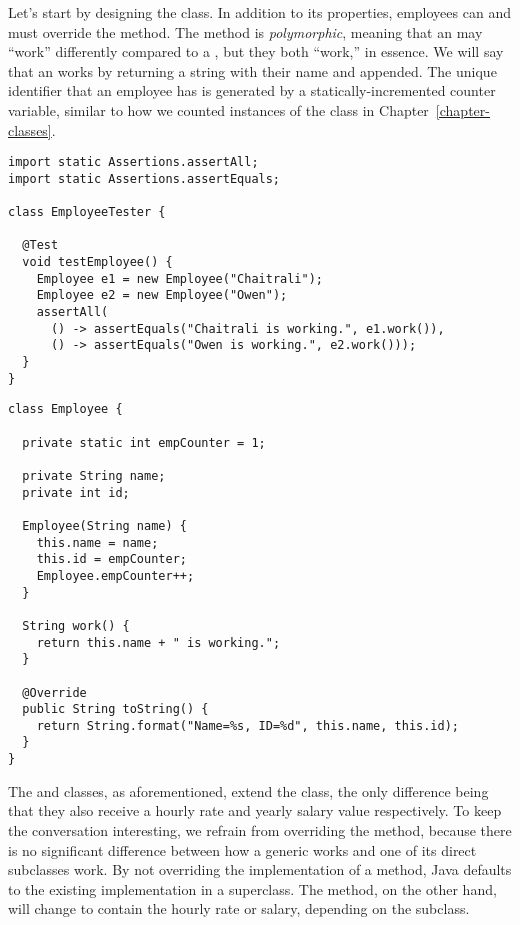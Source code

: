 Let's start by designing the  class. 
In addition to its properties, employees can  and must override the  method. 
The  method is \emph{polymorphic}, meaning that an  may ``work'' differently compared to a , but they both ``work,'' in essence. 
We will say that an  works by returning a string with their name and  appended. 
The unique identifier that an employee has is generated by a statically-incremented counter variable, similar to how we counted instances of the  class in Chapter~\ref{chapter-classes}.

\begin{lstlisting}[language=MyJava]
import static Assertions.assertAll;
import static Assertions.assertEquals;

class EmployeeTester {

  @Test
  void testEmployee() {
    Employee e1 = new Employee("Chaitrali");
    Employee e2 = new Employee("Owen");
    assertAll(
      () -> assertEquals("Chaitrali is working.", e1.work()),
      () -> assertEquals("Owen is working.", e2.work()));
  }
}
\end{lstlisting}

\begin{lstlisting}[language=MyJava]
class Employee {

  private static int empCounter = 1;

  private String name;
  private int id;

  Employee(String name) {
    this.name = name;
    this.id = empCounter;
    Employee.empCounter++;
  }

  String work() {
    return this.name + " is working.";
  }

  @Override
  public String toString() {
    return String.format("Name=%s, ID=%d", this.name, this.id);
  } 
}
\end{lstlisting}

The  and  classes, as aforementioned, extend the  class, the only difference being that they also receive a hourly rate and yearly salary value respectively. 
To keep the conversation interesting, we refrain from overriding the  method, because there is no significant difference between how a generic  works and one of its direct subclasses work. 
By not overriding the implementation of a method, Java defaults to the existing implementation in a superclass. 
The  method, on the other hand, will change to contain the hourly rate or salary, depending on the subclass.

